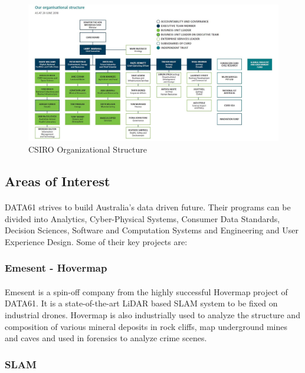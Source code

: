 \begin{figure}[h]
    \centering
    \includegraphics[width=16cm]{figures/csiro_struct.jpg}
    \caption{CSIRO Organizational Structure}\vspace{-4mm}
\end{figure}

\subsection{Areas of Interest}

\paragraph{}
DATA61 strives to build Australia's data driven future. Their programs can be divided into Analytics, Cyber-Physical Systems, Consumer Data Standards, Decision Sciences, Software and Computation Systems and Engineering and User Experience Design. Some of their key projects are:

\subsubsection*{Emesent - Hovermap}
\paragraph{}
Emesent is a spin-off company from the highly successful Hovermap project of DATA61. It is a state-of-the-art LiDAR based SLAM system to be fixed on industrial drones. Hovermap is also industrially used to analyze the structure and composition of various mineral deposits in rock cliffs, map underground mines and caves and used in forensics to analyze crime scenes.

\subsubsection*{SLAM}
